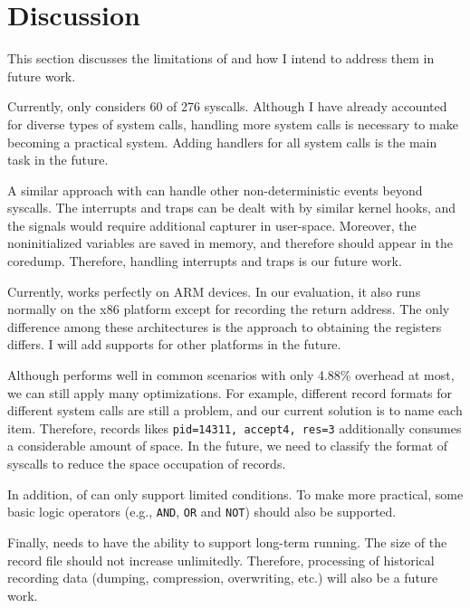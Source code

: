 \section{Discussion} \label{sec:discussion} 

This section discusses the limitations of \TheName and how I intend to address them in future work.

Currently, \TheName only considers 60 of 276 syscalls. Although I have already accounted for diverse types of system calls, handling more system calls is necessary to make \TheName becoming a practical system. Adding handlers for all system calls is the main task in the future.

A similar approach with \TheName can handle other non-deterministic events beyond syscalls. The
interrupts and traps can be dealt with by similar kernel hooks, and the signals
would require additional capturer in user-space. Moreover, the noninitialized variables are saved in memory, and therefore should appear in the coredump. Therefore, handling interrupts and traps is our future work.

Currently, \TheName works perfectly on ARM devices. In our evaluation, it also runs normally on the x86 platform except for recording the return address. The only difference among these architectures is the approach to obtaining the registers differs. I will add supports for other platforms in the future.

Although \TheName performs well in common scenarios with only 4.88\% overhead at most, we can still apply many optimizations. For example, different record formats for different system calls are still a problem, and our current solution is to name each item. Therefore, records likes \texttt{pid=14311, accept4, res=3} additionally consumes a considerable amount of space. In the future, we need to classify the format of syscalls to reduce the space occupation of records.


In addition, \Filter of \TheName can only support limited conditions. To make \TheName more practical, some basic logic operators (e.g., \texttt{AND}, \texttt{OR} and \texttt{NOT}) should also be supported.

Finally, \TheName needs to have the ability to support long-term running. The size of the record file should not increase unlimitedly. Therefore, processing of historical recording data (dumping, compression, overwriting, etc.) will also be a future work.